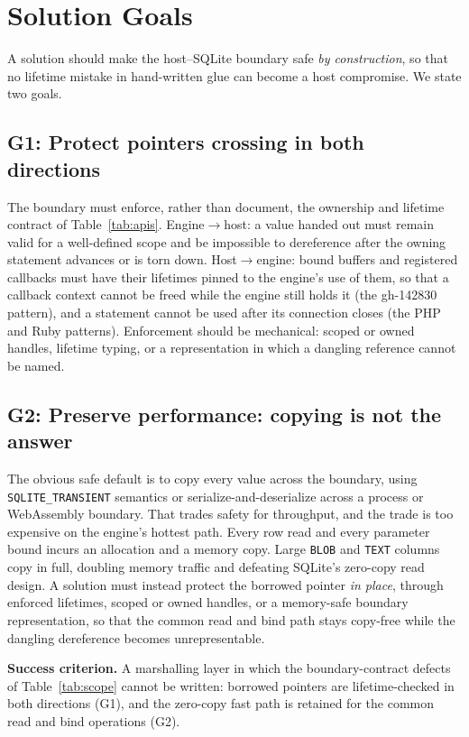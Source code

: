 \documentclass[10pt,twocolumn]{article}
\begin{document}
\section{Solution Goals}
\label{sec:goals}

A solution should make the host--SQLite boundary safe \emph{by construction},
so that no lifetime mistake in hand-written glue can become a host compromise.
We state two goals.

\subsection{G1: Protect pointers crossing in both directions}
The boundary must enforce, rather than document, the ownership and lifetime
contract of Table~\ref{tab:apis}. Engine$\rightarrow$host: a value handed out
must remain valid for a well-defined scope and be impossible to dereference
after the owning statement advances or is torn down. Host$\rightarrow$engine:
bound buffers and registered callbacks must have their lifetimes pinned to the
engine's use of them, so that a callback context cannot be freed while the
engine still holds it (the gh-142830 pattern), and a statement cannot be used
after its connection closes (the PHP and Ruby patterns). Enforcement should be
mechanical: scoped or owned handles, lifetime typing, or a representation in
which a dangling reference cannot be named.

\subsection{G2: Preserve performance: copying is not the answer}
The obvious safe default is to copy every value across the boundary, using
\texttt{SQLITE\_TRANSIENT} semantics or serialize-and-deserialize across a
process or WebAssembly boundary. That trades safety for throughput, and the
trade is too expensive on the engine's hottest path. Every row read and every
parameter bound incurs an allocation and a memory copy. Large \texttt{BLOB} and
\texttt{TEXT} columns copy in full, doubling memory traffic and defeating
SQLite's zero-copy read design. A solution must instead protect the borrowed
pointer \emph{in place}, through enforced lifetimes, scoped or owned handles, or
a memory-safe boundary representation, so that the common read and bind path
stays copy-free while the dangling dereference becomes unrepresentable.

\medskip
\noindent\textbf{Success criterion.} A marshalling layer in which the
boundary-contract defects of Table~\ref{tab:scope} cannot be written: borrowed
pointers are lifetime-checked in both directions (G1), and the zero-copy fast
path is retained for the common read and bind operations (G2).
\end{document}
